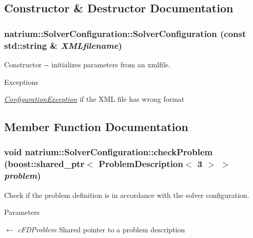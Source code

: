 \subsection{Constructor \& Destructor Documentation}
\hypertarget{classnatrium_1_1SolverConfiguration_a062fa86eca607f830540ef4f2c06f0b3}{
\subsubsection[{SolverConfiguration}]{\setlength{\rightskip}{0pt plus 5cm}natrium::SolverConfiguration::SolverConfiguration (const std::string \& {\em XMLfilename})}}
\label{classnatrium_1_1SolverConfiguration_a062fa86eca607f830540ef4f2c06f0b3}


Constructor -\/-\/ initializes parameters from an xmlfile. 
\begin{DoxyExceptions}{Exceptions}
\item[{\em \hyperlink{classnatrium_1_1ConfigurationException}{ConfigurationException}}]if the XML file has wrong format \end{DoxyExceptions}


\subsection{Member Function Documentation}
\hypertarget{classnatrium_1_1SolverConfiguration_af841d7ee18a68938be3e207cc8e7f787}{
\subsubsection[{checkProblem}]{\setlength{\rightskip}{0pt plus 5cm}void natrium::SolverConfiguration::checkProblem (boost::shared\_\-ptr$<$ {\bf ProblemDescription}$<$ 3 $>$ $>$ {\em problem})}}
\label{classnatrium_1_1SolverConfiguration_af841d7ee18a68938be3e207cc8e7f787}


Check if the problem definition is in accordance with the solver configuration. 
\begin{DoxyParams}{Parameters}
\item[\mbox{$\leftarrow$} {\em cFDProblem}]Shared pointer to a problem description\end{DoxyParams}

